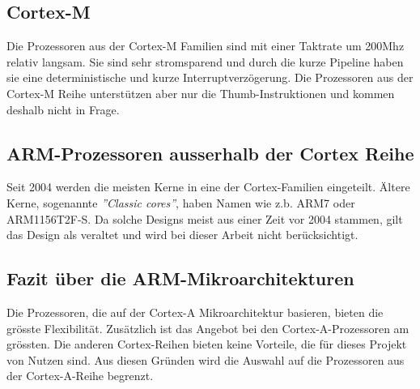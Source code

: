 \subsection{Cortex-M}
Die Prozessoren aus der Cortex-M Familien sind mit einer Taktrate um 200Mhz relativ langsam.
Sie sind sehr stromsparend und durch die kurze Pipeline haben sie eine deterministische und kurze Interruptverzögerung.
Die Prozessoren aus der Cortex-M Reihe unterstützen aber nur die Thumb-Instruktionen und kommen deshalb nicht in Frage.

\subsection{ARM-Prozessoren ausserhalb der Cortex Reihe}
Seit 2004 werden die meisten Kerne in eine der Cortex-Familien eingeteilt.
Ältere Kerne, sogenannte \textit{''Classic cores''}, haben Namen wie z.b. ARM7 oder ARM1156T2F-S.
Da solche Designs meist aus einer Zeit vor 2004 stammen, gilt das Design als veraltet und wird bei dieser Arbeit nicht berücksichtigt.

\subsection{Fazit über die ARM-Mikroarchitekturen}
Die Prozessoren, die auf der Cortex-A Mikroarchitektur basieren, bieten die grösste Flexibilität.
Zusätzlich ist das Angebot bei den Cortex-A-Prozessoren am grössten.
Die anderen Cortex-Reihen bieten keine Vorteile, die für dieses Projekt von Nutzen sind.
Aus diesen Gründen wird die Auswahl auf die Prozessoren aus der Cortex-A-Reihe begrenzt.

